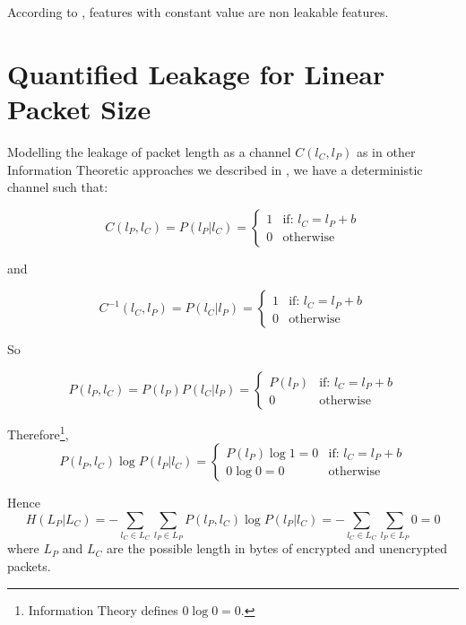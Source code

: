 According to , features with constant value are non leakable features. 

\chapter{Quantified Leakage for Linear Packet Size} \label{Linear Leakage}

Modelling the leakage of packet length as a channel $C(l_{C},l_{P})$ as in other Information Theoretic approaches we described in , we have a deterministic channel such that:

\begin{equation}
	C(l_{P}, l_{C}) = P(l_{P} | l_{C}) = 
	\begin{cases}
		1 &\text{if: } l_{C} = l_{P} + b \\
		0 &\text{otherwise}
	\end{cases}
\end{equation}

and

\begin{equation}
	C^{-1}(l_{C}, l_{P}) = P(l_{C} | l_{P}) = 
	\begin{cases}
		1 &\text{if: } l_{C} = l_{P} + b \\
		0 &\text{otherwise}
	\end{cases}
\end{equation}

So

\begin{equation}
	P(l_{P} , l_{C}) = P(l_{P}) P(l_{C} | l_{P}) =
	\begin{cases}
		P(l_{P}) &\text{if: } l_{C} = l_{P} + b \\
		0 &\text{otherwise}
	\end{cases}
\end{equation}

Therefore\footnote{Information Theory defines $0\log{0} = 0$.},
\begin{equation}
	P(l_{P} , l_{C}) \log{P(l_{P} | l_{C})} = 
	\begin{cases}
		P(l_{P})\log{1} = 0 &\text{if: } l_{C} = l_{P} + b \\
		0 \log{0} = 0 &\text{otherwise}
	\end{cases}
\end{equation}

Hence
\begin{equation}
	H(L_{P} | L_{C}) = - \sum_{l_{C} \in L_{C}} \sum_{l_{P} \in L_{P}}P(l_{P} , l_{C}) \log{P(l_{P} | l_{C})} = - \sum_{l_{C} \in L_{C}} \sum_{l_{P} \in L_{P}} 0 = 0
\end{equation}
where $L_{P}$ and $L_{C}$ are the possible length in bytes of encrypted and unencrypted packets.

